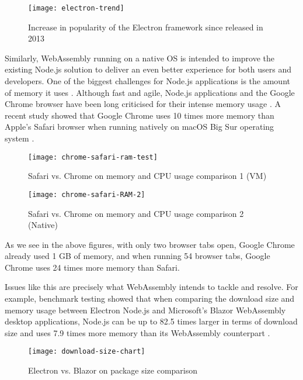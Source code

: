\newpage
\bigskip
\begin{figure}[hp]
\centering
\texttt{[image: electron-trend]}
\caption{\footnotesize{Increase in popularity of the Electron framework since released in 2013 \cite{exp1}}}
\captionsetup{aboveskip=0pt,font=it}
\end{figure}
\bigskip

Similarly, WebAssembly running on a native OS is intended to improve the existing Node.js solution to deliver an even better experience for both users and developers. One of the biggest challenges for Node.js applications is the amount of memory it uses \cite{int35}. Although fast and agile, Node.js applications and the Google Chrome browser have been long criticised for their intense memory usage \cite{int36}. A recent study showed that Google Chrome uses 10 times more memory than Apple's Safari browser when running natively on macOS Big Sur operating system \cite{int37} \cite{int38}.

\newpage

\bigskip
\begin{figure}[hp]
\centering
\texttt{[image: chrome-safari-ram-test]}
\caption{\footnotesize{Safari vs. Chrome on memory and CPU usage comparison 1 (VM) \cite{int39}}}
\captionsetup{aboveskip=0pt,font=it}
\end{figure}
\bigskip

\bigskip
\begin{figure}[hp]
\centering
\texttt{[image: chrome-safari-RAM-2]}
\caption{\footnotesize{Safari vs. Chrome on memory and CPU usage comparison 2 (Native) \cite{int39}}}
\captionsetup{aboveskip=0pt,font=it}
\end{figure}
\bigskip

As we see in the above figures, with only two browser tabs open, Google Chrome already used 1 GB of memory, and when running 54 browser tabs, Google Chrome uses 24 times more memory than Safari.

Issues like this are precisely what WebAssembly intends to tackle and resolve. For example, benchmark testing showed that when comparing the download size and memory usage between Electron Node.js and Microsoft's Blazor WebAssembly desktop applications, Node.js can be up to 82.5 times larger in terms of download size and uses 7.9 times more memory than its WebAssembly counterpart \cite{int40}.

\bigskip
\begin{figure}[hp]
\centering
\texttt{[image: download-size-chart]}
\caption{\footnotesize{Electron vs. Blazor on package size comparison \cite{int40}}}
\captionsetup{aboveskip=0pt,font=it}
\end{figure}
\bigskip

